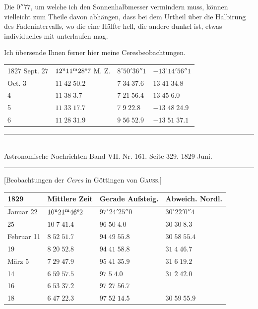 Die $0''77$, um welche ich den Sonnenhalbmesser vermindern muss, können vielleicht zum Theile davon abhängen, dass bei dem Urtheil über die Halbirung des Fadenintervalls, wo die eine Hälfte hell, die andere dunkel ist, etwas individuelles mit unterlaufen mag.

Ich übersende Ihnen ferner hier meine Ceresbeobachtungen.

\begin{center}
\begin{tabular}{l|l|l|l}
1827 Sept. 27 & $12^{\rm u}11^{\rm m}28^{\rm s}7$ M. Z. & $8^\circ50'36''1$ & $-13^\circ14'56''1$ \\
\hfill Oct. 3 & $11\;42\;50.2$ & $7\;34\;37.6$ & $13\;41\;34.8$ \\
\hfill 4 & $11\;38\;3.7$ & $7\;21\;56.4$ & $13\;45\;6.0$ \\
\hfill 5 & $11\;33\;17.7$ & $7\;9\;22.8$ & $-13\;48\;24.9$ \\
\hfill 6 & $11\;28\;31.9$ & $9\;56\;52.9$ & $-13\;51\;37.1$ \\
\end{tabular}
\end{center}

\clearpage
{}
\begin{center}
\rule{0.55\linewidth}{0.4pt}\\[2pt]
Astronomische Nachrichten Band VII. Nr. 161. Seite 329. 1829 Juni.\\[2pt]
\rule{0.55\linewidth}{0.4pt}
\end{center}

\begin{center}[Beobachtungen der \emph{Ceres} in Göttingen von \textsc{Gauss.}]\end{center}

\begin{center}
\begin{tabular}{l|l|l|l}
1829 & Mittlere Zeit & Gerade Aufsteig. & Abweich. Nordl. \\
\hline
Januar 22 & $10^{\rm u}21^{\rm m}46^{\rm s}2$ & $97^\circ24'25''0$ & $30^\circ22'0''4$ \\
\hfill 25 & $10\;7\;41.4$ & $96\;50\;4.0$ & $30\;30\;8.3$ \\
Februar 11 & $8\;52\;51.7$ & $94\;49\;55.8$ & $30\;58\;55.4$ \\
\hfill 19 & $8\;20\;52.8$ & $94\;41\;58.8$ & $31\;4\;46.7$ \\
März 5 & $7\;29\;47.9$ & $95\;41\;35.9$ & $31\;6\;19.2$ \\
\hfill 14 & $6\;59\;57.5$ & $97\;5\;4.0$ & $31\;2\;42.0$ \\
\hfill 16 & $6\;53\;37.2$ & $97\;27\;56.7$ & \\
\hfill 18 & $6\;47\;22.3$ & $97\;52\;14.5$ & $30\;59\;55.9$ \\
\end{tabular}
\end{center}

